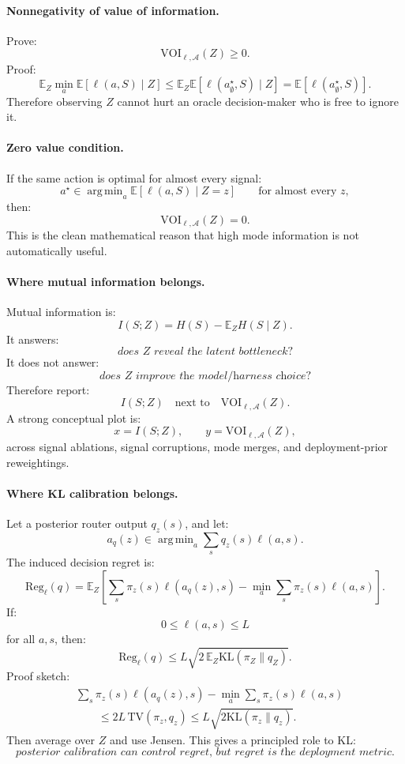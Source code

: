 \documentclass{article}
\newcommand{\KL}{\mathrm{KL}}
\DeclareMathOperator*{\argmin}{arg\,min}
\begin{document}
\paragraph{Nonnegativity of value of information.}
Prove:
\[
    \mathrm{VOI}_{\ell,\mathcal A}(Z)\ge 0.
\]
Proof:
\[
    \mathbb E_Z \min_a \mathbb E[\ell(a,S)\mid Z]
    \le
    \mathbb E_Z \mathbb E[\ell(a^\star_{\emptyset},S)\mid Z]
    =
    \mathbb E[\ell(a^\star_{\emptyset},S)].
\]
Therefore observing \(Z\) cannot hurt an oracle decision-maker who is free to ignore it.

\paragraph{Zero value condition.}
If the same action is optimal for almost every signal:
\[
    a^\star
    \in
    \argmin_a \mathbb E[\ell(a,S)\mid Z=z]
    \qquad
    \text{for almost every }z,
\]
then:
\[
    \mathrm{VOI}_{\ell,\mathcal A}(Z)=0.
\]
This is the clean mathematical reason that high mode information is not automatically useful.

\paragraph{Where mutual information belongs.}
Mutual information is:
\[
    I(S;Z)
    =
    H(S)-\mathbb E_ZH(S\mid Z).
\]
It answers:
\[
    \textit{does \(Z\) reveal the latent bottleneck?}
\]
It does not answer:
\[
    \textit{does \(Z\) improve the model/harness choice?}
\]
Therefore report:
\[
    I(S;Z)
    \quad\text{next to}\quad
    \mathrm{VOI}_{\ell,\mathcal A}(Z).
\]
A strong conceptual plot is:
\[
    x=I(S;Z),
    \qquad
    y=\mathrm{VOI}_{\ell,\mathcal A}(Z),
\]
across signal ablations, signal corruptions, mode merges, and deployment-prior reweightings.

\paragraph{Where KL calibration belongs.}
Let a posterior router output \(q_z(s)\), and let:
\[
    a_q(z)
    \in
    \argmin_a \sum_s q_z(s)\ell(a,s).
\]
The induced decision regret is:
\[
    \mathrm{Reg}_{\ell}(q)
    =
    \mathbb E_Z
    \left[
    \sum_s \pi_z(s)\ell(a_q(z),s)
    -
    \min_a \sum_s \pi_z(s)\ell(a,s)
    \right].
\]
If:
\[
    0\le \ell(a,s)\le L
\]
for all \(a,s\), then:
\[
    \mathrm{Reg}_{\ell}(q)
    \le
    L\sqrt{2\,\mathbb E_Z\KL(\pi_Z\|q_Z)}.
\]
Proof sketch:
\[
\begin{aligned}
    &\sum_s \pi_z(s)\ell(a_q(z),s)
    -
    \min_a \sum_s\pi_z(s)\ell(a,s)\\
    &\qquad\le
    2L\,\mathrm{TV}(\pi_z,q_z)
    \le
    L\sqrt{2\KL(\pi_z\|q_z)}.
\end{aligned}
\]
Then average over \(Z\) and use Jensen.
This gives a principled role to KL:
\[
    \textit{posterior calibration can control regret, but regret is the deployment metric.}
\]
\end{document}
